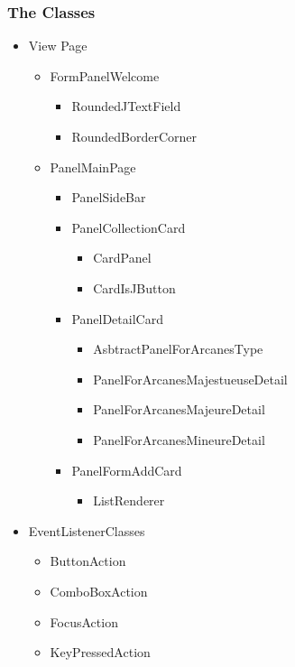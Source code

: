 \documentclass{article}
\begin{document}
\subsubsection{The Classes}\label{the-classes}
\begin{itemize}
 \item View Page
     \begin{itemize}
     \item FormPanelWelcome
        \begin{itemize}
             \item RoundedJTextField
             \item RoundedBorderCorner
        \end{itemize}
     \item PanelMainPage
        \begin{itemize}
             \item PanelSideBar
             \item PanelCollectionCard
                \begin{itemize}
                \item CardPanel
                \item CardIsJButton
                \end{itemize}
             \item PanelDetailCard
                \begin{itemize}
                \item AsbtractPanelForArcanesType
                \item PanelForArcanesMajestueuseDetail
                \item PanelForArcanesMajeureDetail
                \item PanelForArcanesMineureDetail
                \end{itemize}
             \item PanelFormAddCard
                \begin{itemize}
                \item ListRenderer
                \end{itemize}
        \end{itemize}
     \end{itemize}
 \item EventListenerClasses
    \begin{itemize}
    \item ButtonAction
    \item ComboBoxAction
    \item FocusAction
    \item KeyPressedAction
    \end{itemize}
\end{itemize}
\end{document}

